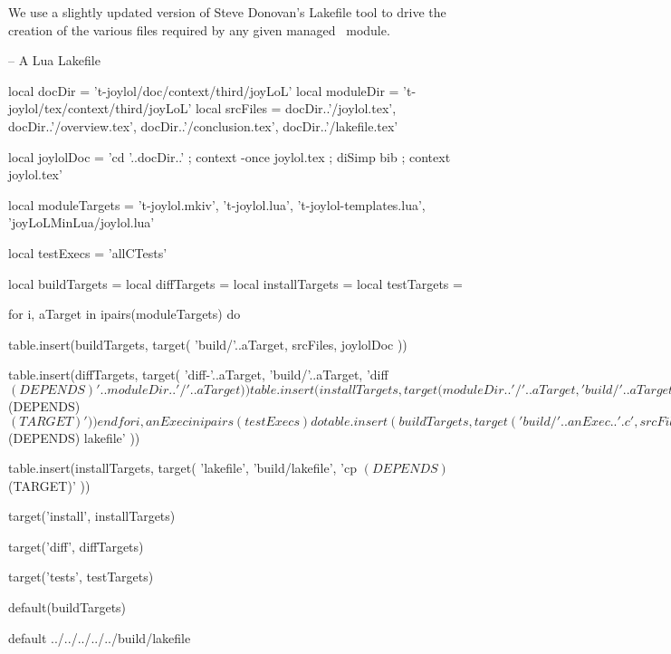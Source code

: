 
\startchapter[title=Lakefile]

We use a slightly updated version of Steve Donovan's Lakefile tool to 
drive the creation of the various files required by any given 
 managed \ConTeXt\ module. 

\startLakefile
-- A Lua Lakefile

local docDir    = 't-joylol/doc/context/third/joyLoL'
local moduleDir = 't-joylol/tex/context/third/joyLoL'
local srcFiles = {
  docDir..'/joylol.tex',
  docDir..'/overview.tex',
  docDir..'/conclusion.tex',
  docDir..'/lakefile.tex'
}

local joylolDoc = 
  'cd '..docDir..' ; context -once joylol.tex ; diSimp bib ; context joylol.tex'

local moduleTargets = {
  't-joylol.mkiv',
  't-joylol.lua',
  't-joylol-templates.lua',
  'joyLoLMinLua/joylol.lua'
}

local testExecs = {
  'allCTests'
}

local buildTargets   = { }
local diffTargets    = { }
local installTargets = { }
local testTargets    = { }

for i, aTarget in ipairs(moduleTargets) do

  table.insert(buildTargets, target(
    'build/'..aTarget,
    srcFiles,
    joylolDoc
  ))

  table.insert(diffTargets, target(
    'diff-'..aTarget,
    'build/'..aTarget,
    'diff $(DEPENDS) '..moduleDir..'/'..aTarget
  ))

  table.insert(installTargets, target(
    moduleDir..'/'..aTarget,
    'build/'..aTarget,
    'cp $(DEPENDS) $(TARGET)'
  ))
end

for i, anExec in ipairs(testExecs) do

  table.insert(buildTargets, target(
    'build/'..anExec..'.c',
    srcFiles,
    joylolDoc
  ))

  c.program{
    'build/'..anExec,
    src=anExec..'.c',
    cdir='build',
    needs='lua5.2'
  }
  
  table.insert(testTargets, target(
    'build/'..anExec..'-results.lua',
    'build/'..anExec,
    './build/'..anExec
  ))
end

table.insert(buildTargets, target(
  'build/lakefile',
  srcFiles,
  joylolDoc
))

table.insert(diffTargets, target(
  'diff-lakefile',
  'build/lakefile',
  'diff $(DEPENDS) lakefile'
))

table.insert(installTargets, target(
  'lakefile',
  'build/lakefile',
  'cp $(DEPENDS) $(TARGET)'
))

target('install', installTargets)

target('diff', diffTargets)

target('tests', testTargets)

default(buildTargets)
\stopLakefile

\createLakefileFile%
  {default}%
  {../../../../../build/lakefile}%
  {}

\stopchapter